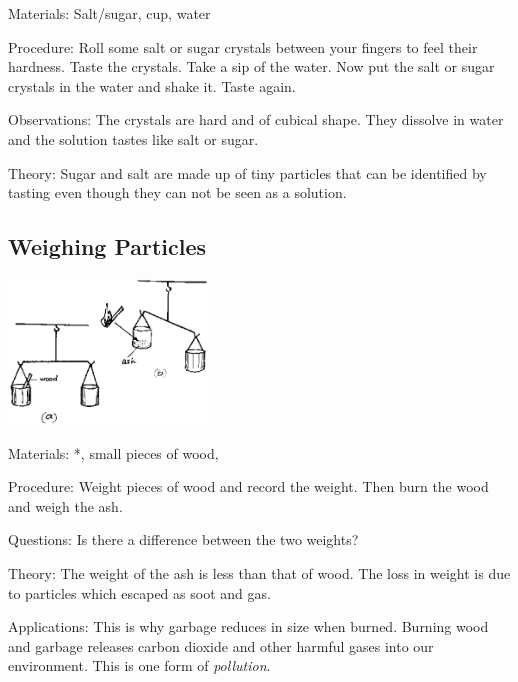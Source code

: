 \begin{multicols}{2}
\begin{description*}
\item[Materials:]{Salt/sugar, cup, water}
\item[Procedure:]{Roll some salt or sugar crystals between your fingers to feel their hardness. Taste the crystals. Take a sip of the water. Now put the salt or sugar crystals in the water and shake it. Taste again.}
\item[Observations:]{The crystals are hard and of cubical shape. They dissolve in water and the solution tastes like salt or sugar.}
\item[Theory:]{Sugar and salt are made up of tiny particles that can be identified by tasting even though they can not be seen as a solution.}
\end{description*}

\subsection{Weighing Particles}

\begin{center}
\includegraphics[width=0.4\textwidth]{./img/source/weighing-particles.png}
\end{center}

\begin{description*}
\item[Materials:]{*, small pieces of wood, }
\item[Procedure:]{Weight pieces of wood and record the weight. Then burn the wood and weigh the ash.}
\item[Questions:]{Is there a difference between the two weights?}
\item[Theory:]{The weight of the ash is less than that of wood. The loss in weight is due to particles which escaped as soot and gas.}
\item[Applications:]{This is why garbage reduces in size when burned. Burning wood and garbage releases carbon dioxide and other harmful gases into our environment. This is one form of \emph{pollution}.}
\end{description*}


\end{multicols}
